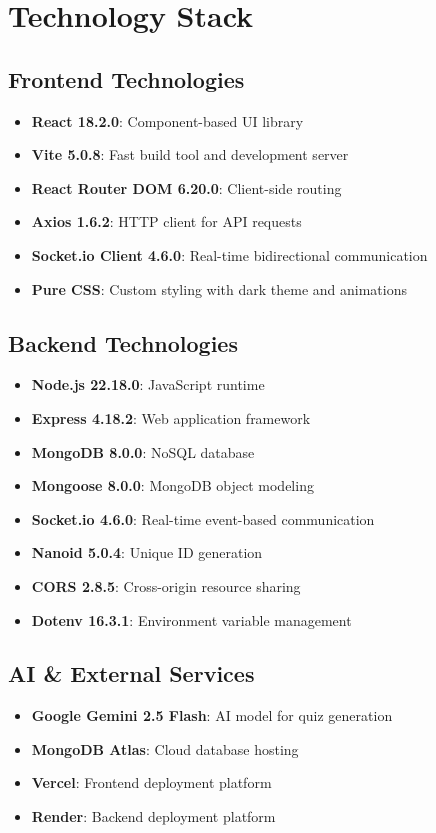\documentclass[12pt,a4paper]{article}
\begin{document}
\section{Technology Stack}

\subsection{Frontend Technologies}
\begin{itemize}
    \item \textbf{React 18.2.0}: Component-based UI library
    \item \textbf{Vite 5.0.8}: Fast build tool and development server
    \item \textbf{React Router DOM 6.20.0}: Client-side routing
    \item \textbf{Axios 1.6.2}: HTTP client for API requests
    \item \textbf{Socket.io Client 4.6.0}: Real-time bidirectional communication
    \item \textbf{Pure CSS}: Custom styling with dark theme and animations
\end{itemize}

\subsection{Backend Technologies}
\begin{itemize}
    \item \textbf{Node.js 22.18.0}: JavaScript runtime
    \item \textbf{Express 4.18.2}: Web application framework
    \item \textbf{MongoDB 8.0.0}: NoSQL database
    \item \textbf{Mongoose 8.0.0}: MongoDB object modeling
    \item \textbf{Socket.io 4.6.0}: Real-time event-based communication
    \item \textbf{Nanoid 5.0.4}: Unique ID generation
    \item \textbf{CORS 2.8.5}: Cross-origin resource sharing
    \item \textbf{Dotenv 16.3.1}: Environment variable management
\end{itemize}

\subsection{AI \& External Services}
\begin{itemize}
    \item \textbf{Google Gemini 2.5 Flash}: AI model for quiz generation
    \item \textbf{MongoDB Atlas}: Cloud database hosting
    \item \textbf{Vercel}: Frontend deployment platform
    \item \textbf{Render}: Backend deployment platform
\end{itemize}
\end{document}
